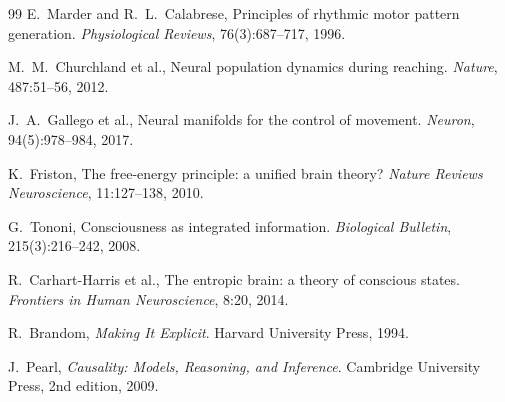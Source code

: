 \documentclass[12pt, a4paper]{article}
\theoremstyle{remark}
\theoremstyle{definition}
\begin{document}
\begin{thebibliography}{99}
E.~Marder and R.~L.~Calabrese,
\newblock Principles of rhythmic motor pattern generation.
\newblock \emph{Physiological Reviews}, 76(3):687--717, 1996.

M.~M.~Churchland et al.,
\newblock Neural population dynamics during reaching.
\newblock \emph{Nature}, 487:51--56, 2012.

J.~A.~Gallego et al.,
\newblock Neural manifolds for the control of movement.
\newblock \emph{Neuron}, 94(5):978--984, 2017.

K.~Friston,
\newblock The free-energy principle: a unified brain theory?
\newblock \emph{Nature Reviews Neuroscience}, 11:127--138, 2010.

G.~Tononi,
\newblock Consciousness as integrated information.
\newblock \emph{Biological Bulletin}, 215(3):216--242, 2008.

R.~Carhart-Harris et al.,
\newblock The entropic brain: a theory of conscious states.
\newblock \emph{Frontiers in Human Neuroscience}, 8:20, 2014.

R.~Brandom,
\newblock \emph{Making It Explicit}.
\newblock Harvard University Press, 1994.

J.~Pearl,
\newblock \emph{Causality: Models, Reasoning, and Inference}.
\newblock Cambridge University Press, 2nd edition, 2009.

\end{thebibliography}
\end{document}
